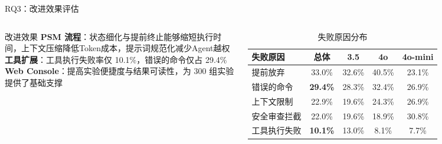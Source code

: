 \begin{frame}{RQ3：改进效果评估}
    \scriptsize
    \begin{columns}
        \begin{block}{改进效果}
            \textbf{PSM 流程}：状态细化与提前终止能够缩短执行时间，上下文压缩降低Token成本，提示词规范化减少Agent越权 \\[0.3em]
            \textbf{工具扩展}：工具执行失败率仅 10.1\%，错误的命令仅占 29.4\% \\[0.3em]
            \textbf{Web Console}：提高实验便捷度与结果可读性，为 300 组实验提供了基础支撑
        \end{block}

        \begin{table}
            \centering
            \scriptsize
            \begin{tabular}{@{}lcccc@{}}
                \toprule
                \textbf{失败原因} & \textbf{总体} & \textbf{3.5} & \textbf{4o} & \textbf{4o-mini} \\ \midrule
                提前放弃         & 33.0\%  & 32.6\% & 40.5\% & 23.1\% \\
                错误的命令       & \textbf{29.4\%}  & 28.3\% & 32.4\% & 26.9\% \\
                上下文限制       & 22.9\%  & 19.6\% & 24.3\% & 26.9\% \\
                安全审查拦截     & 22.0\%  & 19.6\% & 18.9\% & 30.8\% \\
                工具执行失败     & \textbf{10.1\%} & 13.0\% & 8.1\% & 7.7\% \\ \bottomrule
            \end{tabular}
            \caption{失败原因分布}
        \end{table}
    \end{columns}
\end{frame}
